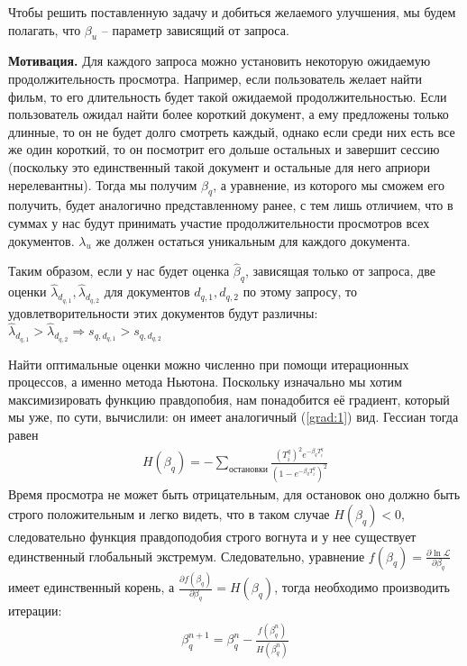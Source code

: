 \documentclass[diploma]{nanolab2015}
\begin{document}
Чтобы решить поставленную задачу и добиться желаемого улучшения, мы будем полагать, что $\beta_u$ -- параметр зависящий от запроса.

\textbf{Мотивация.} Для каждого запроса можно установить некоторую ожидаемую продолжительность просмотра. Например, если пользователь желает найти фильм, то его длительность будет такой ожидаемой продолжительностью. Если пользователь ожидал найти более короткий документ, а ему предложены только длинные, то он не будет долго смотреть каждый, однако если среди них есть все же один короткий, то он посмотрит его дольше остальных и завершит сессию (поскольку это единственный такой документ и остальные для него априори нерелевантны). Тогда мы получим $\beta_q$, а уравнение, из которого мы сможем его получить, будет аналогично представленному ранее, с тем лишь отличием, что в суммах у нас будут принимать участие продолжительности просмотров всех документов. $\lambda_u$ же должен остаться уникальным для каждого документа.

Таким образом, если у нас будет оценка $\hat{\beta}_q$, зависящая только от запроса, две оценки $\hat{\lambda}_{d_{q,1}}, \hat{\lambda}_{d_{q,2}}$ для документов $d_{q,1}, d_{q,2}$ по этому запросу, то удовлетворительности этих документов будут различны: $\hat{\lambda}_{d_{q,1}} > \hat{\lambda}_{d_{q,2}} \Rightarrow s_{q,d_{q,1}} > s_{q,d_{q,2}}$

Найти оптимальные оценки можно численно при помощи итерационных процессов, а именно метода Ньютона. Поскольку изначально мы хотим максимизировать функцию правдопобия, нам понадобится её градиент, который мы уже, по сути, вычислили: он имеет аналогичный (\ref{grad:1}) вид. Гессиан тогда равен
\begin{align}
    H(\beta_q) = - \sum_{\text{остановки}} \frac{(T_i^q)^2 e^{-\beta_q T_i^q}}{(1 - e^{-\beta_q T_i^q})^2}
\end{align}
Время просмотра не может быть отрицательным, для остановок оно должно быть строго положительным и легко видеть, что в таком случае $H(\beta_q) < 0$, следовательно функция правдоподобия строго вогнута и у нее существует единственный глобальный экстремум. Следовательно, уравнение $ f(\beta_q) = \frac{\partial \ln \mathcal{L}}{\partial \beta_q}$ имеет единственный корень, а $\frac{\partial f(\beta_q)}{\partial \beta_q} = H(\beta_q)$, тогда необходимо производить итерации:
\begin{align}
    \beta_q^{n+1} = \beta_q^{n} - \frac{f(\beta_q^n)}{H(\beta_q^n)}
\end{align}
\end{document}
